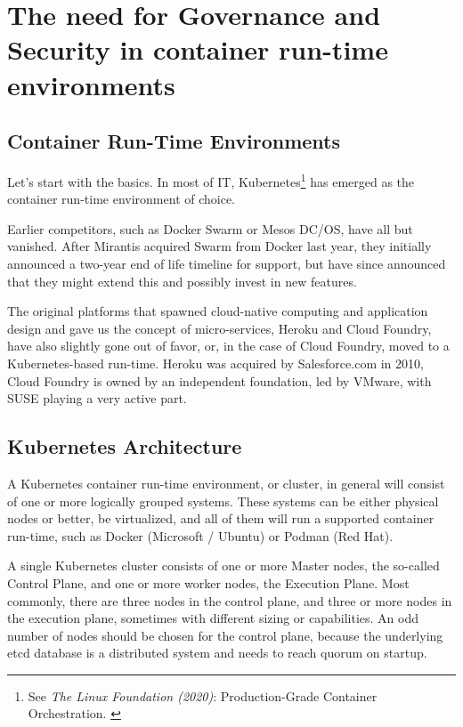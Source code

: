 %
%

\pagebreak
\section{The need for Governance and Security in container run-time environments}

\onehalfspacing

\subsection{Container Run-Time Environments}

Let's start with the basics. In most of IT, Kubernetes\footnote{See \textit{The Linux Foundation (2020)}: Production-Grade Container Orchestration. \cite{kubernetes}} has emerged as the container run-time environment of choice.

Earlier competitors, such as Docker Swarm or Mesos DC/OS, have all but vanished. After Mirantis acquired Swarm from Docker last year, they initially announced a two-year end of life timeline for support, but have since announced that they might extend this and possibly invest in new features.

The original platforms that spawned cloud-native computing and application design and gave us the concept of micro-services, Heroku and Cloud Foundry, have also slightly gone out of favor, or, in the case of Cloud Foundry, moved to a Kubernetes-based run-time. Heroku was acquired by Salesforce.com in 2010, Cloud Foundry is owned by an independent foundation, led by VMware, with SUSE playing a very active part.

\subsection{Kubernetes Architecture}

A Kubernetes container run-time environment, or cluster, in general will consist of one or more logically grouped systems. These systems can be either physical nodes or better, be virtualized, and all of them will run a supported container run-time, such as Docker (Microsoft / Ubuntu) or Podman (Red Hat).

A single Kubernetes cluster consists of one or more Master nodes, the so-called Control Plane, and one or more worker nodes, the Execution Plane. Most commonly, there are three nodes in the control plane, and three or more nodes in the execution plane, sometimes with different sizing or capabilities. An odd number of nodes should be chosen for the control plane, because the underlying etcd database is a distributed system and needs to reach quorum on startup.

